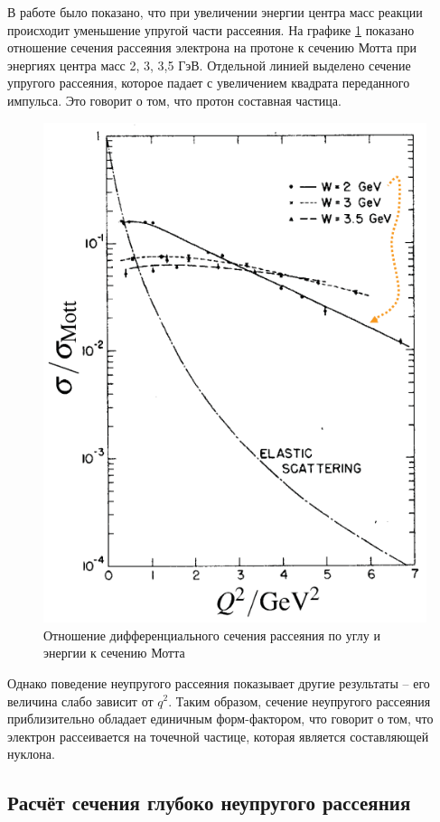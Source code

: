 \documentclass{extreport}
\begin{document}
В работе \cite{Breidenbach} было показано, что при увеличении энергии центра масс реакции происходит уменьшение упругой части рассеяния. На графике \ref{fig:Mott} показано отношение сечения рассеяния электрона на протоне к сечению Мотта при энергиях центра масс 2, 3, 3,5 ГэВ. Отдельной линией выделено сечение упругого рассеяния, которое падает с увеличением квадрата переданного импульса. Это говорит о том, что протон составная частица. 
\begin{figure}[h]
    \centering
    \includegraphics[width = 0.6\linewidth]{Mott.png}
    \caption{Отношение дифференциального сечения рассеяния по углу и энергии к сечению Мотта \cite{Breidenbach}}
    \label{fig:Mott}
\end{figure}

Однако поведение неупругого рассеяния показывает другие результаты -- его величина слабо зависит от $q^2$. Таким образом, сечение неупругого рассеяния приблизительно обладает единичным форм-фактором, что говорит о том, что электрон рассеивается на точечной частице, которая является составляющей нуклона.

\subsection{Расчёт сечения глубоко неупругого рассеяния}
\end{document}
